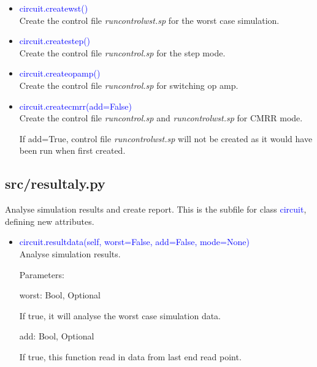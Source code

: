 \documentclass[12pt,a4paper]{article}
\begin{document}
\begin{itemize}[leftmargin=*]
\begin{itemize}[leftmargin=*]
    \item \textcolor{blue}{circuit.create\textunderscore wst()}\\
        Create the control file \textit{run\textunderscore control\textunderscore wst.sp} for the worst case simulation.

    \item \textcolor{blue}{circuit.create\textunderscore step()}\\
        Create the control file \textit{run\textunderscore control.sp} for the step mode.

    \item \textcolor{blue}{circuit.create\textunderscore opamp()}\\
        Create the control file \textit{run\textunderscore control.sp} for switching op amp.

    \item \textcolor{blue}{circuit.create\textunderscore cmrr(add=False)}\\
        Create the control file \textit{run\textunderscore control.sp} and \textit{run\textunderscore control\textunderscore wst.sp} for CMRR mode.

        If add=True, control file \textit{run\textunderscore control\textunderscore wst.sp} will not be created as it would have been run when first created.

\end{itemize}

\subsection{src/\textunderscore resultaly.py}
Analyse simulation results and create report. This is the subfile for class \textcolor{blue}{circuit}, defining new attributes.

\begin{itemize}
    \item \textcolor{blue}{circuit.resultdata(self, worst=False, add=False, mode=None)}\\
        Analyse simulation results.

        Parameters:

        worst: Bool, Optional\par
        \quad If true, it will analyse the worst case simulation data.

        add: Bool, Optional\par
        \quad If true, this function read in data from last end read point.


\end{itemize}
\end{itemize}
\end{document}
